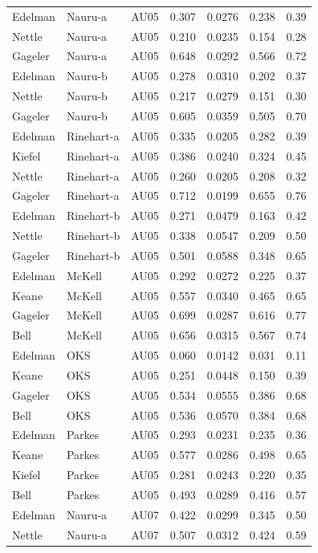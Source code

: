 \documentclass{monashthesis}
\begin{document}
\begin{center}
\begin{longtable}{lllllll}
Edelman & Nauru-a & AU05 & 0.307 & 0.0276 & 0.238 & 0.39 \\
Nettle & Nauru-a & AU05 & 0.210 & 0.0235 & 0.154 & 0.28 \\
Gageler & Nauru-a & AU05 & 0.648 & 0.0292 & 0.566 & 0.72 \\
Edelman & Nauru-b & AU05 & 0.278 & 0.0310 & 0.202 & 0.37 \\
Nettle & Nauru-b & AU05 & 0.217 & 0.0279 & 0.151 & 0.30 \\
Gageler & Nauru-b & AU05 & 0.605 & 0.0359 & 0.505 & 0.70 \\
Edelman & Rinehart-a & AU05 & 0.335 & 0.0205 & 0.282 & 0.39 \\
Kiefel & Rinehart-a & AU05 & 0.386 & 0.0240 & 0.324 & 0.45 \\
Nettle & Rinehart-a & AU05 & 0.260 & 0.0205 & 0.208 & 0.32 \\
Gageler & Rinehart-a & AU05 & 0.712 & 0.0199 & 0.655 & 0.76 \\
Edelman & Rinehart-b & AU05 & 0.271 & 0.0479 & 0.163 & 0.42 \\
Nettle & Rinehart-b & AU05 & 0.338 & 0.0547 & 0.209 & 0.50 \\
Gageler & Rinehart-b & AU05 & 0.501 & 0.0588 & 0.348 & 0.65 \\
Edelman & McKell & AU05 & 0.292 & 0.0272 & 0.225 & 0.37 \\
Keane & McKell & AU05 & 0.557 & 0.0340 & 0.465 & 0.65 \\
Gageler & McKell & AU05 & 0.699 & 0.0287 & 0.616 & 0.77 \\
Bell & McKell & AU05 & 0.656 & 0.0315 & 0.567 & 0.74 \\
Edelman & OKS & AU05 & 0.060 & 0.0142 & 0.031 & 0.11 \\
Keane & OKS & AU05 & 0.251 & 0.0448 & 0.150 & 0.39 \\
Gageler & OKS & AU05 & 0.534 & 0.0555 & 0.386 & 0.68 \\
Bell & OKS & AU05 & 0.536 & 0.0570 & 0.384 & 0.68 \\
Edelman & Parkes & AU05 & 0.293 & 0.0231 & 0.235 & 0.36 \\
Keane & Parkes & AU05 & 0.577 & 0.0286 & 0.498 & 0.65 \\
Kiefel & Parkes & AU05 & 0.281 & 0.0243 & 0.220 & 0.35 \\
Bell & Parkes & AU05 & 0.493 & 0.0289 & 0.416 & 0.57 \\
Edelman & Nauru-a & AU07 & 0.422 & 0.0299 & 0.345 & 0.50 \\
Nettle & Nauru-a & AU07 & 0.507 & 0.0312 & 0.424 & 0.59 \\

\end{longtable}
\end{center}
\end{document}
